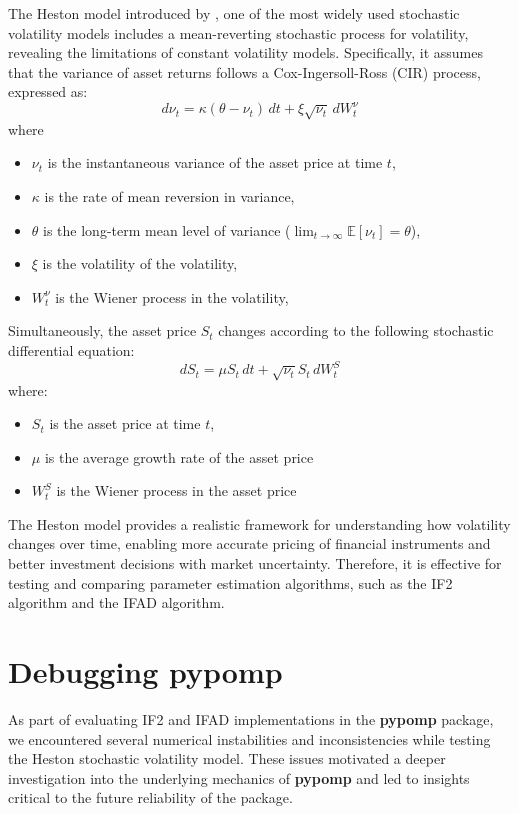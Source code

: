 \documentclass[11pt]{report}
\begin{document}
The Heston model introduced by \citet{heston1993closed}, one of the most widely used stochastic volatility models includes a mean-reverting stochastic process for volatility, revealing the limitations of constant volatility models. Specifically, it assumes that the variance of asset returns follows a Cox-Ingersoll-Ross (CIR) process, expressed as:
\[d\nu_t = \kappa(\theta - \nu_t) \, dt + \xi \sqrt{\nu_t} \,dW_t^\nu\]
where 
\begin{itemize}
    \item $\nu_t$ is the instantaneous variance of the asset price at time $t$,
    \item $\kappa$ is the rate of mean reversion in variance, 
    \item $\theta$ is the long-term mean level of variance ($\lim_{t \to \infty} \mathbb{E}[\nu_t] = \theta$),
    \item $\xi$ is the volatility of the volatility,
    \item $W_t^\nu$ is the Wiener process in the volatility,
\end{itemize}
Simultaneously, the asset price $S_t$ changes according to the following stochastic differential equation:
 \[dS_t = \mu S_t\, dt + \sqrt{\nu_t} S_t \, dW_t^S\] 
 where:
\begin{itemize}
\item $S_t$ is the asset price at time $t$,
\item $\mu$ is the average growth rate of the asset price 
\item $W_t^S$ is the Wiener process in the asset price
\end{itemize}
 
The Heston model provides a realistic framework for understanding how volatility changes over time, enabling more accurate pricing of financial instruments and better investment decisions with market uncertainty. Therefore, it is effective for testing and comparing parameter estimation algorithms, such as the IF2 algorithm and the IFAD algorithm.
\newpage

\chapter{Debugging pypomp}\label{chap:debugging}
As part of evaluating IF2 and IFAD implementations in the \textbf{pypomp} package, we encountered several numerical instabilities and inconsistencies while testing the Heston stochastic volatility model. These issues motivated a deeper investigation into the underlying mechanics of \textbf{pypomp} and led to insights critical to the future reliability of the package.
\end{document}
